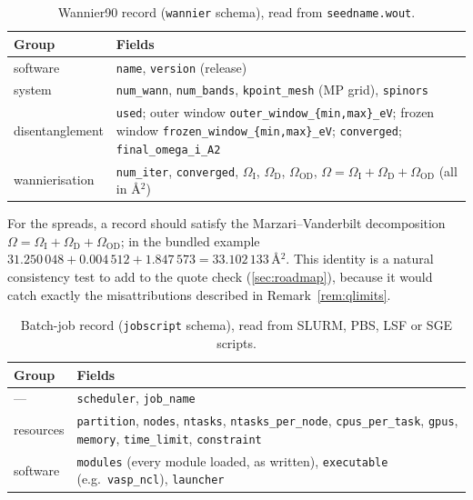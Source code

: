 \documentclass[11pt,a4paper]{article}
\newcommand{\code}[1]{\texttt{#1}}
\begin{document}
\begin{table}[h]
\centering\small
\caption{Wannier90 record (\code{wannier} schema), read from \code{seedname.wout}.}
\label{tab:wannier}
\begin{tabularx}{\linewidth}{@{}l>{\raggedright\arraybackslash}X@{}}
\toprule
\headfont Group & \headfont Fields \\
\midrule
software        & \code{name}, \code{version} (release) \\
system          & \code{num\_wann}, \code{num\_bands}, \code{kpoint\_mesh} (MP grid), \code{spinors} \\
disentanglement & \code{used}; outer window \code{outer\_window\_\{min,max\}\_eV}; frozen window \code{frozen\_window\_\{min,max\}\_eV};
                  \code{converged}; \code{final\_omega\_i\_A2} \\
wannierisation  & \code{num\_iter}, \code{converged}, \(\Omega_{\mathrm I}\), \(\Omega_{\mathrm D}\), \(\Omega_{\mathrm{OD}}\),
                  \(\Omega=\Omega_{\mathrm I}+\Omega_{\mathrm D}+\Omega_{\mathrm{OD}}\) (all in \AA\(^2\)) \\
\bottomrule
\end{tabularx}
\end{table}

For the spreads, a record should satisfy the Marzari--Vanderbilt decomposition
\(\Omega=\Omega_{\mathrm I}+\Omega_{\mathrm D}+\Omega_{\mathrm{OD}}\); in the bundled example
\(31.250\,048 + 0.004\,512 + 1.847\,573 = 33.102\,133\,\)\AA\(^2\). This identity is a natural consistency test to add to the
quote check (\cref{sec:roadmap}), because it would catch exactly the misattributions described in Remark~\ref{rem:qlimits}.

\begin{table}[h]
\centering\small
\caption{Batch-job record (\code{jobscript} schema), read from SLURM, PBS, LSF or SGE scripts.}
\label{tab:job}
\begin{tabularx}{\linewidth}{@{}l>{\raggedright\arraybackslash}X@{}}
\toprule
\headfont Group & \headfont Fields \\
\midrule
---       & \code{scheduler}, \code{job\_name} \\
resources & \code{partition}, \code{nodes}, \code{ntasks}, \code{ntasks\_per\_node}, \code{cpus\_per\_task}, \code{gpus},
            \code{memory}, \code{time\_limit}, \code{constraint} \\
software  & \code{modules} (every module loaded, as written), \code{executable} (e.g.\ \code{vasp\_ncl}), \code{launcher} \\
\bottomrule
\end{tabularx}
\end{table}
\end{document}
